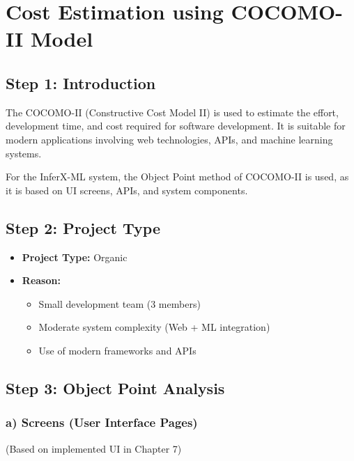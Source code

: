 \section{Cost Estimation using COCOMO-II Model}

\subsection*{Step 1: Introduction}
The COCOMO-II (Constructive Cost Model II) is used to estimate the effort, development time, and cost required for software development. It is suitable for modern applications involving web technologies, APIs, and machine learning systems.
\vspace{0.4cm}

For the InferX-ML system, the Object Point method of COCOMO-II is used, as it is based on UI screens, APIs, and system components.
\vspace{0.4cm}

\subsection*{Step 2: Project Type}
\begin{itemize}
    \item \textbf{Project Type:} Organic
    \item \textbf{Reason:}
    \begin{itemize}
        \item Small development team (3 members)
        \item Moderate system complexity (Web + ML integration)
        \item Use of modern frameworks and APIs
    \end{itemize}
\end{itemize}
\vspace{0.4cm}

\subsection*{Step 3: Object Point Analysis}
\subsubsection*{a) Screens (User Interface Pages)}
(Based on implemented UI in Chapter 7)
\vspace{0.2cm}

